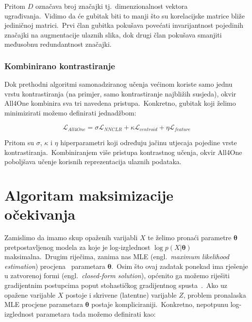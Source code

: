\documentclass[diplomskirad]{fer}
\begin{document}
Pritom $D$ označava broj značajki tj.\ dimenzionalnost vektora ugrađivanja.\ Vidimo da će gubitak biti to manji što su korelacijske matrice bliže jediničnoj matrici.\ 
Prvi član gubitka pokušava povećati invarijantnost pojedinih značajki na augmentacije ulaznih slika, dok drugi član pokušava smanjiti međusobnu redundantnost značajki.\ 

\subsection{Kombinirano kontrastiranje}
\label{sub:kombinirano_kontrastiranje}

Dok prethodni algoritmi samonadziranog učenja većinom koriste samo jednu vrstu kontrastiranja (na primjer, samo kontrastiranje najbližih susjeda), okvir All4One kombinira sva tri navedena pristupa.\ 
Konkretno, gubitak koji želimo minimizirati možemo definirati jednadžbom:

\begin{equation}
  \mathcal{L}_{All4One} = \sigma \mathcal{L}_{NNCLR} + \kappa \mathcal{L}_{centroid} + \eta \mathcal{L}_{feature}
  \label{eq:all4one_loss}
\end{equation}

Pritom su $\sigma$, $\kappa$ i $\eta$ hiperparametri koji određuju jačinu utjecaja pojedine vrste kontrastiranja.\ 
Kombiniranjem više pristupa kontrastnog učenja, okvir All4One poboljšava učenje korisnih reprezentacija ulaznih podataka.\

\chapter{Algoritam maksimizacije očekivanja}
\label{pog:em_algoritam}

Zamislimo da imamo skup opaženih varijabli $X$ te želimo pronaći parametre $\bm{\theta}$ pretpostavljenog modela za koje je log-izglednost $\log p(X | \bm{\theta})$ maksimalna.\ 
Drugim riječima, zanima nas MLE (engl.\ \textit{maximum likelihood estimation}) procjena~\cite{myung2003tutorial} parametara $\bm{\theta}$.\ 
Osim što ovaj zadatak ponekad ima rješenje u zatvorenoj formi (engl.\ \textit{closed-form solution}), općenito ga možemo riješiti gradijentnim postupcima poput stohastičkog gradijentnog spusta~\cite{amari1993backpropagation}.\ 
Ako uz opažene varijable $X$ postoje i skrivene (latentne) varijable $Z$, problem pronalaska MLE procjene parametara $\bm{\theta}$ postaje kompliciraniji.\  
Konkretno, nepotpunu log-izglednost parametara tada možemo definirati kao:
\end{document}
